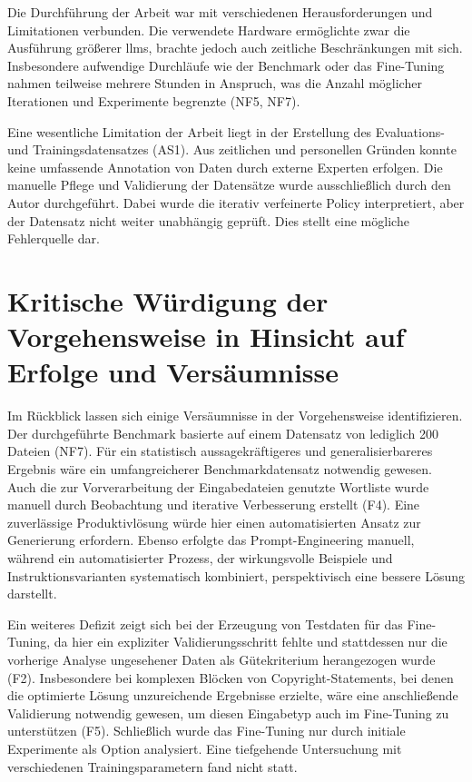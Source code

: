 Die Durchführung der Arbeit war mit verschiedenen Herausforderungen und Limitationen verbunden.
Die verwendete Hardware ermöglichte zwar die Ausführung größerer \glspl{llm}, brachte jedoch auch zeitliche Beschränkungen mit sich.
Insbesondere aufwendige Durchläufe wie der Benchmark oder das Fine-Tuning nahmen teilweise mehrere Stunden in Anspruch, was die Anzahl möglicher Iterationen und Experimente begrenzte (NF5, NF7).

Eine wesentliche Limitation der Arbeit liegt in der Erstellung des Evaluations- und Trainingsdatensatzes (AS1).
Aus zeitlichen und personellen Gründen konnte keine umfassende Annotation von Daten durch externe Experten erfolgen.
Die manuelle Pflege und Validierung der Datensätze wurde ausschließlich durch den Autor durchgeführt.
Dabei wurde die iterativ verfeinerte Policy interpretiert, aber der Datensatz nicht weiter unabhängig geprüft.
Dies stellt eine mögliche Fehlerquelle dar.


\section{Kritische Würdigung der Vorgehensweise in Hinsicht auf Erfolge und Versäumnisse}

Im Rückblick lassen sich einige Versäumnisse in der Vorgehensweise identifizieren.
Der durchgeführte Benchmark basierte auf einem Datensatz von lediglich \num{200} Dateien (NF7).
Für ein statistisch aussagekräftigeres und generalisierbareres Ergebnis wäre ein umfangreicherer Benchmarkdatensatz notwendig gewesen.
Auch die zur Vorverarbeitung der Eingabedateien genutzte Wortliste wurde manuell durch Beobachtung und iterative Verbesserung erstellt (F4).
Eine zuverlässige Produktivlösung würde hier einen automatisierten Ansatz zur Generierung erfordern.
Ebenso erfolgte das Prompt-Engineering manuell, während ein automatisierter Prozess, der wirkungsvolle Beispiele und Instruktionsvarianten systematisch kombiniert, perspektivisch eine bessere Lösung darstellt.

Ein weiteres Defizit zeigt sich bei der Erzeugung von Testdaten für das Fine-Tuning, da hier ein expliziter Validierungsschritt fehlte und stattdessen nur die vorherige Analyse ungesehener Daten als Gütekriterium herangezogen wurde (F2).
Insbesondere bei komplexen Blöcken von Copyright-Statements, bei denen die optimierte Lösung unzureichende Ergebnisse erzielte, wäre eine anschließende Validierung notwendig gewesen, um diesen Eingabetyp auch im Fine-Tuning zu unterstützen (F5).
Schließlich wurde das Fine-Tuning nur durch initiale Experimente als Option analysiert.
Eine tiefgehende Untersuchung mit verschiedenen Trainingsparametern fand nicht statt.

